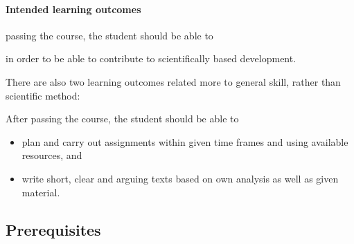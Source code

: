 \paragraph{Intended learning outcomes}\label{LearningOutcomes}

\begin{frame}[fragile]
  passing the course, the student should be able to
    \item\LOrelate*
    \item\LOevaluate*
    \item\LOapply*
  in order to be able to contribute to scientifically based development.
\end{frame}

There are also two learning outcomes related more to general skill, rather than 
scientific method:
\begin{frame}[fragile]
  After passing the course, the student should be able to
  \begin{itemize}
    \item plan and carry out assignments within given time frames and using 
      available resources, and
    \item write short, clear and arguing texts based on own analysis as well as 
      given material.
  \end{itemize}
\end{frame}

\subsection<article>{Prerequisites}

